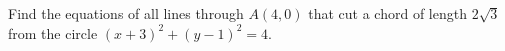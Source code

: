 Find the equations of all lines through $A(4,0)$ that cut a chord of length $2\sqrt3$ from the circle $(x+3)^2+(y-1)^2=4$.

